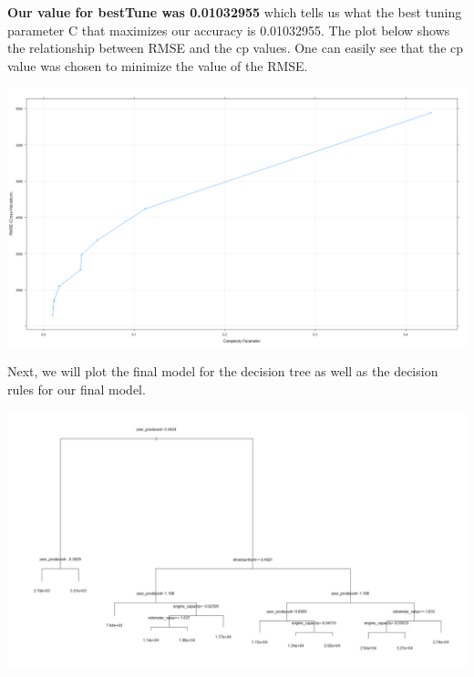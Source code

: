 \documentclass[
]{article}
\newenvironment{Shaded}{\begin{snugshade}}{\end{snugshade}}
\newcommand{\AttributeTok}[1]{\textcolor[rgb]{0.77,0.63,0.00}{#1}}
\newcommand{\CommentTok}[1]{\textcolor[rgb]{0.56,0.35,0.01}{\textit{#1}}}
\newcommand{\ConstantTok}[1]{\textcolor[rgb]{0.00,0.00,0.00}{#1}}
\newcommand{\DecValTok}[1]{\textcolor[rgb]{0.00,0.00,0.81}{#1}}
\newcommand{\FunctionTok}[1]{\textcolor[rgb]{0.00,0.00,0.00}{#1}}
\newcommand{\NormalTok}[1]{#1}
\newcommand{\SpecialCharTok}[1]{\textcolor[rgb]{0.00,0.00,0.00}{#1}}
\begin{document}
\textbf{Our value for bestTune was 0.01032955} which tells us what the
best tuning parameter C that maximizes our accuracy is 0.01032955. The
plot below shows the relationship between RMSE and the cp values. One
can easily see that the cp value was chosen to minimize the value of the
RMSE.

\includegraphics{images/Main Goal/Decision Tree/plot(model_DT_Train)_1920_1080.png}

Next, we will plot the final model for the decision tree as well as the
decision rules for our final model.

\begin{Shaded}
\end{Shaded}

\includegraphics{images/Main Goal/Decision Tree/plot(model_DT_Train$finalModel)Text.png}
\end{document}
